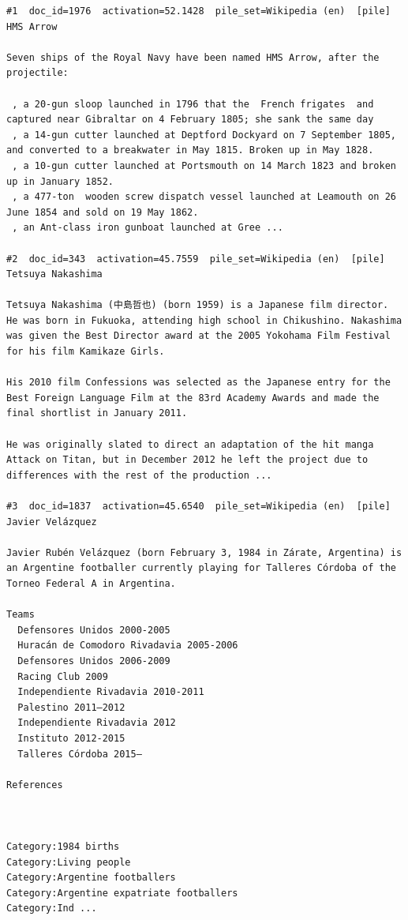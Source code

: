 \begin{verbatim}
#1  doc_id=1976  activation=52.1428  pile_set=Wikipedia (en)  [pile]
HMS Arrow

Seven ships of the Royal Navy have been named HMS Arrow, after the projectile:

 , a 20-gun sloop launched in 1796 that the  French frigates  and  captured near Gibraltar on 4 February 1805; she sank the same day
 , a 14-gun cutter launched at Deptford Dockyard on 7 September 1805, and converted to a breakwater in May 1815. Broken up in May 1828.
 , a 10-gun cutter launched at Portsmouth on 14 March 1823 and broken up in January 1852.
 , a 477-ton  wooden screw dispatch vessel launched at Leamouth on 26 June 1854 and sold on 19 May 1862.
 , an Ant-class iron gunboat launched at Gree ...

#2  doc_id=343  activation=45.7559  pile_set=Wikipedia (en)  [pile]
Tetsuya Nakashima

Tetsuya Nakashima (中島哲也) (born 1959) is a Japanese film director. He was born in Fukuoka, attending high school in Chikushino. Nakashima was given the Best Director award at the 2005 Yokohama Film Festival for his film Kamikaze Girls.

His 2010 film Confessions was selected as the Japanese entry for the Best Foreign Language Film at the 83rd Academy Awards and made the final shortlist in January 2011.

He was originally slated to direct an adaptation of the hit manga Attack on Titan, but in December 2012 he left the project due to differences with the rest of the production ...

#3  doc_id=1837  activation=45.6540  pile_set=Wikipedia (en)  [pile]
Javier Velázquez

Javier Rubén Velázquez (born February 3, 1984 in Zárate, Argentina) is an Argentine footballer currently playing for Talleres Córdoba of the Torneo Federal A in Argentina.

Teams
  Defensores Unidos 2000-2005
  Huracán de Comodoro Rivadavia 2005-2006
  Defensores Unidos 2006-2009
  Racing Club 2009
  Independiente Rivadavia 2010-2011
  Palestino 2011–2012
  Independiente Rivadavia 2012
  Instituto 2012-2015
  Talleres Córdoba 2015–

References
 
 

Category:1984 births
Category:Living people
Category:Argentine footballers
Category:Argentine expatriate footballers
Category:Ind ...


\end{verbatim}
